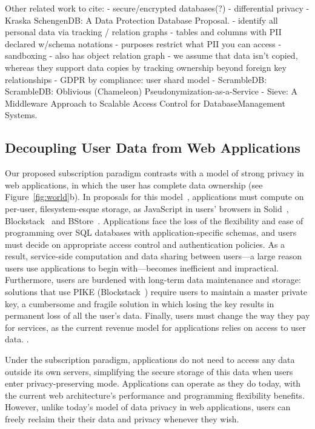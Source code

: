 Other related work to cite:
- secure/encrypted databases(?)
- differential privacy
- Kraska SchengenDB: A Data Protection Database Proposal.
    - identify all personal data via tracking / relation graphs
    - tables and columns with PII declared w/schema notations
    - purposes restrict what PII you can access
    - sandboxing
    - also has object relation graph
    - we assume that data isn't copied, whereas they support data copies by tracking ownership
    beyond foreign key relationships
- GDPR by compliance: user shard model
- ScrambleDB: ScrambleDB: Oblivious (Chameleon) Pseudonymization-as-a-Service
- Sieve: A Middleware Approach to Scalable Access Control for DatabaseManagement Systems.

\subsection{Decoupling User Data from Web Applications}
Our proposed subscription paradigm contrasts with a model of strong privacy in web applications, in
which the user has complete data ownership (see Figure~\ref{fig:world}b). In proposals for this
model~\cite{solid, amber, w5, blockstack, bstore}, applications must compute on per-user, filesystem-esque
storage, \eg as JavaScript in users' browsers in Solid~\cite{solid}, Blockstack~\cite{blockstack} and
BStore~\cite{bstore}. Applications face the loss of the flexibility and ease of programming over SQL
databases with application-specific schemas, and users must decide on appropriate access control and
authentication policies. As a result, service-side computation and data sharing between users---a
large reason users use applications to begin with---becomes inefficient and impractical.
%
Furthermore, users are burdened with long-term data maintenance and storage: solutions that use PIKE
(\eg Blockstack~\cite{blockstack}) require users to maintain a
master private key, a cumbersome and fragile solution in which losing the key results in permanent
loss of all the user's data.
%
Finally, users must change the way they pay for services, as the current revenue model for
applications relies on access to user data.
.

Under the subscription paradigm, applications do not need to access any data outside its own
servers, simplifying the secure storage of this data when users enter privacy-preserving mode.
Applications can operate as they do today, with the current web architecture's performance and
programming flexibility benefits. However, unlike today's model of data privacy in web applications,
users can freely reclaim their their data and privacy whenever they wish.

